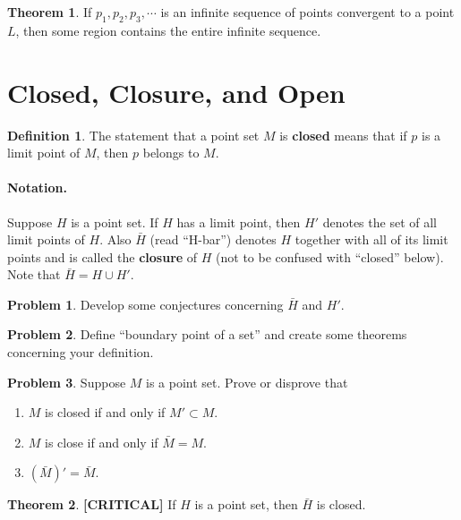 \documentclass{article}
\theoremstyle{definition}
\newtheorem{definition}{Definition}
\newtheorem{theorem}{Theorem}
\theoremstyle{definition}
\newtheorem{problem}{Problem}
\theoremstyle{plain}
\begin{document}
\begin{theorem}
  If $p_1, p_2, p_3, \cdots$ is an infinite sequence of points convergent to a
  point $L$, then some region contains the entire infinite sequence.
\end{theorem}

\section*{Closed, Closure, and Open}

\begin{definition}
  The statement that a point set $M$ is \textbf{closed} means that if $p$ is a
  limit point of $M$, then $p$ belongs to $M$.
\end{definition}

\paragraph{Notation.}  Suppose $H$ is a point set.  If $H$ has a limit point,
then $H'$ denotes the set of all limit points of $H$.  Also $\bar{H}$
(read ``H-bar'') denotes $H$ together with all of its limit points and is
called the \textbf{closure} of $H$ (not to be confused with ``closed'' below).
Note that $\bar{H} = H \cup H'$.

\begin{problem}
  Develop some conjectures concerning $\bar{H}$ and $H'$.
\end{problem}

\begin{problem}
  Define ``boundary point of a set'' and create some theorems concerning your
  definition.
\end{problem}

\begin{problem}
  Suppose $M$ is a point set.  Prove or disprove that
  \begin{enumerate}
    \item $M$ is closed if and only if $M' \subset M$.
    \item $M$ is close if and only if $\bar{M} = M$.
    \item $(\bar{M})' = \bar{M}$.
  \end{enumerate}
\end{problem}

\begin{theorem}
  \textbf{[CRITICAL]} If $H$ is a point set, then $\bar{H}$ is closed.
\end{theorem}
\end{document}
